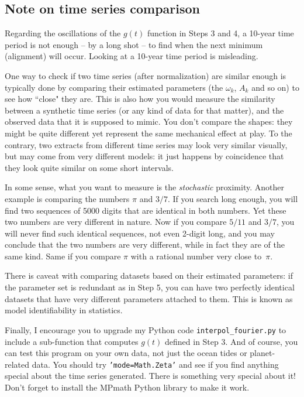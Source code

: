 \documentclass[oneside,10pt]{book}
\begin{document}
\subsection{Note on time series comparison}

 Regarding the oscillations of the $g(t)$ function in Steps 3 and 4, a 10-year time period is not enough -- by a long shot -- to find when the next minimum (alignment) will occur. Looking at a 10-year time period is misleading.

One way to check if two time series (after \textcolor{index}{normalization}) are similar enough is typically done by comparing their estimated parameters (the $\omega_k$, $A_k$ and so on) to see how ``close" they are. This is also how you would measure the similarity between a synthetic time series (or any kind of data for that matter), and the observed data that it is supposed to mimic. You don't compare the shapes: they might be quite different yet represent the same mechanical effect at play. To the contrary, two extracts from different time series may look very similar visually, but may come from very different models: it just happens by coincidence that they look quite similar on some short intervals. 

In some sense, what you want to measure is the {\em stochastic} proximity. Another example is comparing the numbers $\pi$ and $3/7$. If you search long enough, you will find two sequences of \num{5000} digits that are identical in both numbers. Yet these two numbers are very different in nature. Now if you compare $5/11$ and $3/7$, you will never find such identical sequences, not even 2-digit long, and you may conclude that the two numbers are very different, while in fact they are of the same kind. Same if you compare $\pi$ with a rational number very close to~$\pi$.

There is caveat with comparing datasets based on their estimated parameters: if the parameter set is redundant as in Step 5, you can have two perfectly identical datasets that have very different parameters attached to them. This is known as \textcolor{index}{model identifiability} in statistics. 

Finally, I encourage you to upgrade my Python code \texttt{interpol\_fourier.py} to include a sub-function that computes $g(t)$ defined in Step 3. And of course, you can test this program on your own data, not just the ocean tides or planet-related data. You should try \texttt{'mode=Math.Zeta'} and see if you find anything special about the time series generated. There is something very special about it! Don't forget to install the MPmath Python library to make it work.
\end{document}
